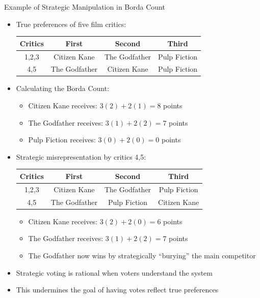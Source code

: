 \documentclass[10pt]{beamer}
\begin{document}
\begin{frame}{Example of Strategic Manipulation in Borda Count}
  \begin{itemize}
    \item True preferences of five film critics:
      \begin{table}
        \center
        \begin{tabular}{cccc}
          \toprule
          \textbf{Critics} & \textbf{First} & \textbf{Second} & \textbf{Third} \\
          \midrule
          1,2,3 & Citizen Kane & The Godfather & Pulp Fiction \\
          4,5 & The Godfather & Citizen Kane & Pulp Fiction \\
          \bottomrule
        \end{tabular}
      \end{table}
    \item Calculating the Borda Count:
      \begin{itemize}
        \item Citizen Kane receives: $3(2) + 2(1) = 8$ points
        \item The Godfather receives: $3(1) + 2(2) = 7$ points
        \item Pulp Fiction receives: $3(0) + 2(0) = 0$ points
      \end{itemize}
    \item Strategic misrepresentation by critics 4,5:
      \begin{table}
        \center
        \begin{tabular}{cccc}
          \toprule
          \textbf{Critics} & \textbf{First} & \textbf{Second} & \textbf{Third} \\
          \midrule
          1,2,3 & Citizen Kane & The Godfather & Pulp Fiction \\
          4,5 & The Godfather & Pulp Fiction & Citizen Kane \\
          \bottomrule
        \end{tabular}
      \end{table}
      \begin{itemize}
        \item Citizen Kane receives: $3(2) + 2(0) = 6$ points
        \item The Godfather receives: $3(1) + 2(2) = 7$ points
        \item The Godfather now wins by strategically ``burying'' the main competitor
      \end{itemize}
    \item Strategic voting is rational when voters understand the system
    \item This undermines the goal of having votes reflect true preferences
  \end{itemize}
\end{frame}
\end{document}
